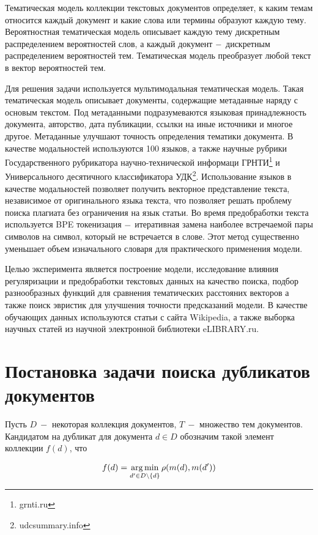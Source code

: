 \documentclass[12pt, twoside]{article}
\begin{document}
Тематическая модель коллекции текстовых документов определяет, к каким темам относится каждый документ и какие слова или термины образуют каждую тему. Вероятностная тематическая модель описывает каждую тему дискретным распределением вероятностей слов, а каждый документ $\--$ дискретным распределением вероятностей тем. Тематическая модель преобразует любой текст в вектор вероятностей тем. 

Для решения задачи используется мультимодальная тематическая модель. Такая тематическая модель описывает документы, содержащие метаданные наряду с основым текстом. Под метаданными подразумеваются языковая принадлежность документа, авторство, дата публикации, ссылки на иные источники и многое другое. Метаданные улучшают точность определения тематики документа. В качестве модальностей используются 100 языков, а также научные рубрики Государственного рубрикатора научно-технической информаци ГРНТИ\footnote{grnti.ru} и Универсального десятичного классификатора УДК\footnote{udcsummary.info}. Использование языков в качестве модальностей позволяет получить векторное представление текста, независимое от оригинального языка текста, что позволяет решать проблему поиска плагиата без ограничения на язык статьи. Во время предобработки текста используется BPE токенизация $\--$ итеративная замена наиболее встречаемой пары символов на символ, который не встречается в слове. Этот метод существенно уменьшает объем изначального словаря для практического применения модели.

Целью эксперимента является построение модели, исследование влияния регуляризации и предобработки текстовых данных на качество поиска, подбор разнообразных функций для сравнения тематических расстояних векторов а также поиск эвристик для улучшения точности предсказаний модели. В качестве обучающих данных используются статьи с сайта Wikipedia, а также выборка научных статей из научной электронной библиотеки eLIBRARY.ru.

\section{Постановка задачи поиска дубликатов документов}

Пусть $D~-$ некоторая коллекция документов, $T~-$ множество тем документов. Кандидатом на дубликат  для документа $d \in D$ обозначим такой элемент коллекции $f(d)$, что 

\begin{equation} \label{eq1}
\begin{split}
f(d) = \argmin_{d' \in D \setminus \{d\}} \rho(m(d), m(d'))
\end{split}
\end{equation}
\end{document}

